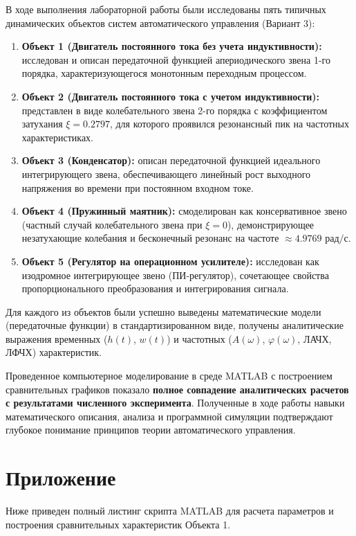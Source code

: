 \documentclass[12pt, a4paper]{article}
\begin{document}
В ходе выполнения лабораторной работы были исследованы пять типичных динамических объектов систем автоматического управления (Вариант 3):
\begin{enumerate}
    \item \textbf{Объект 1 (Двигатель постоянного тока без учета индуктивности):} исследован и описан передаточной функцией апериодического звена 1-го порядка, характеризующегося монотонным переходным процессом.
    \item \textbf{Объект 2 (Двигатель постоянного тока с учетом индуктивности):} представлен в виде колебательного звена 2-го порядка с коэффициентом затухания $\xi = 0.2797$, для которого проявился резонансный пик на частотных характеристиках.
    \item \textbf{Объект 3 (Конденсатор):} описан передаточной функцией идеального интегрирующего звена, обеспечивающего линейный рост выходного напряжения во времени при постоянном входном токе.
    \item \textbf{Объект 4 (Пружинный маятник):} смоделирован как консервативное звено (частный случай колебательного звена при $\xi = 0$), демонстрирующее незатухающие колебания и бесконечный резонанс на частоте $\approx 4.9769\text{ рад/с}$.
    \item \textbf{Объект 5 (Регулятор на операционном усилителе):} исследован как изодромное интегрирующее звено (ПИ-регулятор), сочетающее свойства пропорционального преобразования и интегрирования сигнала.
\end{enumerate}

Для каждого из объектов были успешно выведены математические модели (передаточные функции) в стандартизированном виде, получены аналитические выражения временных ($h(t)$, $w(t)$) и частотных ($A(\omega)$, $\varphi(\omega)$, ЛАЧХ, ЛФЧХ) характеристик. 

Проведенное компьютерное моделирование в среде MATLAB с построением сравнительных графиков показало \textbf{полное совпадение аналитических расчетов с результатами численного эксперимента}. Полученные в ходе работы навыки математического описания, анализа и программной симуляции подтверждают глубокое понимание принципов теории автоматического управления.


\newpage
\section{Приложение}

Ниже приведен полный листинг скрипта MATLAB для расчета параметров и построения сравнительных характеристик Объекта 1.
\end{document}
